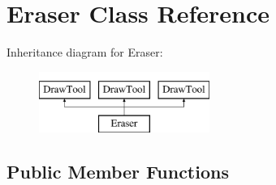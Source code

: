 \hypertarget{classEraser}{\section{Eraser Class Reference}
\label{classEraser}
}
Inheritance diagram for Eraser\-:\begin{figure}[H]
\begin{center}
\leavevmode
\includegraphics[height=2.000000cm]{classEraser}
\end{center}
\end{figure}
\subsection*{Public Member Functions}
